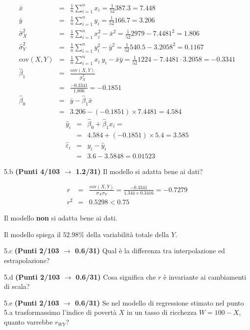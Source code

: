 \documentclass[
  11pt,
]{book}
\theoremstyle{mytheoremstyle}
\theoremstyle{mydefstyle}
\begin{document}
\begin{eqnarray*}
           \bar x &=&\frac 1 n\sum_{i=1}^n x_i = \frac {1}{ 52 }  387.3 =  7.448 \\
           \bar y &=&\frac 1 n\sum_{i=1}^n y_i = \frac {1}{ 52 }  166.7 =  3.206 \\
           \hat\sigma_X^2&=&\frac 1 n\sum_{i=1}^n x_i^2-\bar x^2=\frac {1}{ 52 }  2979  - 7.4481 ^2= 1.806 \\
           \hat\sigma_Y^2&=&\frac 1 n\sum_{i=1}^n y_i^2-\bar y^2=\frac {1}{ 52 }  540.5  - 3.2058 ^2= 0.1167 \\
           \text{cov}(X,Y)&=&\frac 1 n\sum_{i=1}^n x_i~y_i-\bar x\bar y=\frac {1}{ 52 }  1224 - 7.4481 \cdot 3.2058 = -0.3341 \\
           \hat\beta_1 &=& \frac{\text{cov}(X,Y)}{\hat\sigma_X^2} \\
                    &=& \frac{ -0.3341 }{ 1.806 }  =  -0.1851 \\
           \hat\beta_0 &=& \bar y - \hat\beta_1 \bar x\\
                    &=&  3.206 - (-0.1851) \times  7.4481 = 4.584 
         \end{eqnarray*}\begin{eqnarray*}
\hat y_i &=&\hat\beta_0+\hat\beta_1 x_i=\\ 
&=& 4.584 + (-0.1851) \times 5.4 = 3.585 \\ 
\hat \varepsilon_i &=& y_i-\hat y_i\\ 
&=& 3.6 - 3.5848 = 0.01523  
\end{eqnarray*}

5.b \textbf{(Punti 4/103 \(\rightarrow\) 1.2/31)} Il modello si adatta bene ai dati?

\begin{eqnarray*}
r&=&\frac{\text{cov}(X,Y)}{\sigma_X\sigma_Y}=\frac{ -0.3341 }{ 1.344 \times 0.3416 }= -0.7279 \\ 
r^2&=& 0.5298 < 0.75
\end{eqnarray*}

Il modello \textbf{non} si adatta bene ai dati.

Il modello spiega il \(52.98\%\) della variabilità totale della \(Y\).

5.c \textbf{(Punti 2/103 \(\rightarrow\) 0.6/31)} Qual è la differenza tra interpolazione ed estrapolazione?

5.d \textbf{(Punti 2/103 \(\rightarrow\) 0.6/31)} Cosa significa che \(r\) è invariante ai cambiamenti di scala?

5.e \textbf{(Punti 2/103 \(\rightarrow\) 0.6/31)} Se nel modello di regressione stimato nel punto 5.a trasformassimo
l'indice di povertà \(X\) in un tasso di ricchezza \(W=100-X\), quanto varrebbe \(r_{WY}\)?
\end{document}
